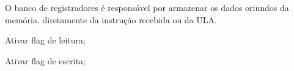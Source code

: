
	O banco de registradores é responsável por armazenar os dados oriundos da memória, diretamente da instrução recebida ou da ULA.

	\actors
    \begin{description}
    \end{description}

	\begin{mainflow}
    \item Ativar flag de leitura;
    \item Ativar flag de escrita;
  	\end{mainflow}
